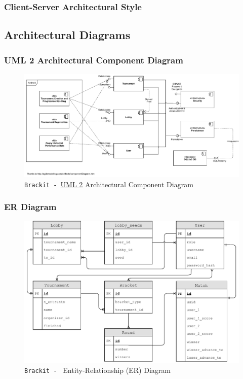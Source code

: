 \documentclass{article}
\begin{document}
\subsubsection{Client-Server Architectural Style}
\lipsum[2-4]
\clearpage
\subsection{Architectural Diagrams}
\subsubsection{UML 2 Architectural Component Diagram}
\vfill
\begin{center}
    \begin{figure}[htp]
        \centering
        \includegraphics[width=14.5cm]{../diagrams/component_diag.pdf}
        \caption{\texttt{Brackit - }\href{https://sparxsystems.com/resources/tutorials/uml2/index.html}{UML 2} Architectural Component Diagram}
        \end{figure}
\end{center}
\vfill

\clearpage
\subsubsection{ER Diagram}
\vfill
\begin{center}
    \begin{figure}[h]
        \centering
        \includegraphics[width=12.5cm]{../diagrams/er_compressed.pdf}
        \caption{\texttt{Brackit - } Entity-Relationship (ER) Diagram}
        \end{figure}
\end{center}
\vfill
\clearpage
\end{document}
